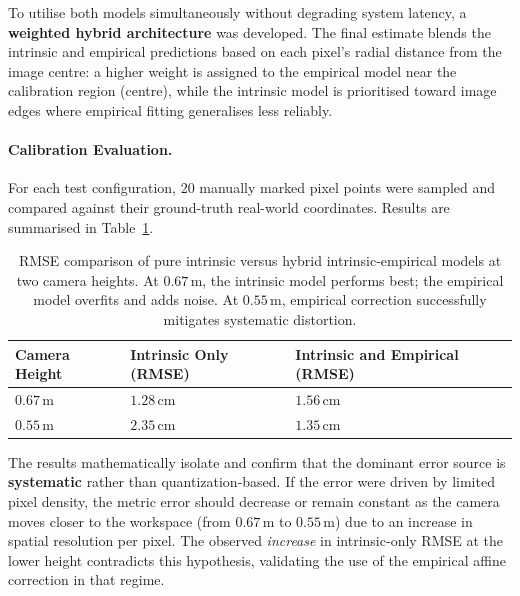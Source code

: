\documentclass[12pt]{extarticle}
\begin{document}
To utilise both models simultaneously without degrading system latency, a \textbf{weighted hybrid architecture} was developed. The final estimate blends the intrinsic and empirical predictions based on each pixel's radial distance from the image centre: a higher weight is assigned to the empirical model near the calibration region (centre), while the intrinsic model is prioritised toward image edges where empirical fitting generalises less reliably.

\paragraph{Calibration Evaluation.}

For each test configuration, 20 manually marked pixel points were sampled and compared against their ground-truth real-world coordinates. Results are summarised in Table~\ref{tab:error_isolation}.

\begin{table}[htbp]
    \centering
    \caption{RMSE comparison of pure intrinsic versus hybrid intrinsic-empirical models at two camera heights. At $0.67\,\text{m}$, the intrinsic model performs best; the empirical model overfits and adds noise. At $0.55\,\text{m}$, empirical correction successfully mitigates systematic distortion.}
    \label{tab:error_isolation}
    \begin{tabularx}{\textwidth}{@{} >{\centering\arraybackslash}X >{\centering\arraybackslash}X >{\centering\arraybackslash}X @{}}
        \toprule
        \textbf{Camera Height} & \textbf{Intrinsic Only (RMSE)} & \textbf{Intrinsic and Empirical (RMSE)} \\
        \midrule
        $0.67\,\text{m}$ & $1.28\,\text{cm}$ & $1.56\,\text{cm}$ \\
        $0.55\,\text{m}$ & $2.35\,\text{cm}$ & $1.35\,\text{cm}$ \\
        \bottomrule
    \end{tabularx}
\end{table}

The results mathematically isolate and confirm that the dominant error source is \textbf{systematic} rather than quantization-based. If the error were driven by limited pixel density, the metric error should decrease or remain constant as the camera moves closer to the workspace (from $0.67\,\text{m}$ to $0.55\,\text{m}$) due to an increase in spatial resolution per pixel. The observed \textit{increase} in intrinsic-only RMSE at the lower height contradicts this hypothesis, validating the use of the empirical affine correction in that regime.
\end{document}
